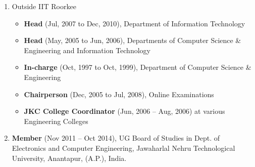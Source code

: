 \begin{enumerate}
\item
Outside IIT Roorkee

\begin{itemize}
\item
\textbf{Head} (Jul, 2007 to Dec, 2010), Department of Information Technology 

\item
\textbf{Head} (May, 2005 to Jun, 2006), Departments of Computer Science \& Engineering and Information Technology

\item
\textbf{In-charge} (Oct, 1997 to Oct, 1999), Department of Computer Science \& Engineering

\item
\textbf{Chairperson} (Dec, 2005 to Jul, 2008), Online Examinations

\item
\textbf{JKC College Coordinator} (Jun, 2006 – Aug, 2006) at various Engineering Colleges
\end{itemize}


\item
\textbf{Member} (Nov 2011 – Oct 2014), UG Board of Studies in Dept. of Electronics and Computer Engineering, Jawaharlal Nehru Technological University, Anantapur, (A.P.), India.	

\end{enumerate}